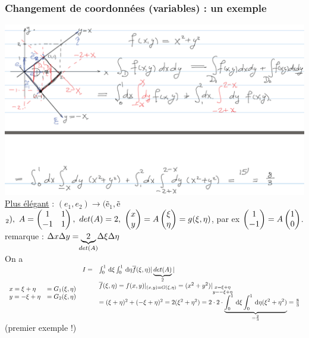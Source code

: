 \documentclass[12pt,a4paper]{article}
\begin{document}
\subsubsection{Changement de coordonnées (variables) : un exemple}
\includegraphics[scale=0.5]{images/chgt_coord}\\
\uline{Plus élégant} : $(e_1,e_2) \longrightarrow ($\~e$_1,$\~e$_2),\ A = \begin{pmatrix}
1 & 1\\
-1 & 1
\end{pmatrix},\ det(A) = 2,\ \begin{pmatrix} x \\ y \end{pmatrix} = A\begin{pmatrix} \xi \\ \eta \end{pmatrix} = g(\xi,\eta)$, par ex $\begin{pmatrix} 1 \\ -1 \end{pmatrix} = A\begin{pmatrix} 1 \\ 0 \end{pmatrix}$. remarque : $\Delta x \Delta y = \underbrace{2}_{\mathclap{det(A)}} \Delta \xi \Delta \eta$\\
On a 
$\begin{array}{ll}
	x = \xi + \eta &= G_1(\xi,\eta)\\
	y = -\xi +\eta &= G_2(\xi,\eta)
\end{array}\\
\begin{array}{ll}
I = &\int_0^1\, \mathrm d \xi\int_0^1\, \mathrm d \eta \overline{f}(\xi,\eta)|\underbrace{det(A)}_2|\\
& \overline{f}(\xi,\eta) = f(x,y)|_{(x,y) = G(\xi,\eta)} = (x^2+y^2)|_{\substack{x=\xi+\eta \\ y = -\xi + \eta}}\\
&=(\xi + \eta)^2 + (-\xi+\eta)^2 = 2(\xi^2 + \eta^2) = 2\cdot 2 \cdot \underbrace{\int_0^1 \, \mathrm d \xi \int_0^1\, \mathrm d \eta (\xi^2 + \eta^2)}_{=\frac{2}{3}} = \frac{8}{3}
\end{array}$\\
(premier exemple !)
\end{document}
